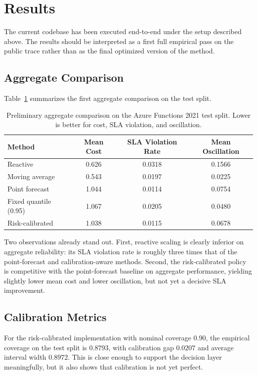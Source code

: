 \documentclass[11pt]{article}
\theoremstyle{plain}
\theoremstyle{definition}
\theoremstyle{remark}
\begin{document}
\section{Results}
The current codebase has been executed end-to-end under the setup described above. The results should be interpreted as a first full empirical pass on the public trace rather than as the final optimized version of the method.

\subsection{Aggregate Comparison}
Table~\ref{tab:aggregate-results} summarizes the first aggregate comparison on the test split.

\begin{table}[h]
\centering
\caption{Preliminary aggregate comparison on the Azure Functions 2021 test split. Lower is better for cost, SLA violation, and oscillation.}
\label{tab:aggregate-results}
\begin{tabular}{lccc}
\toprule
Method & Mean Cost & SLA Violation Rate & Mean Oscillation \\
\midrule
Reactive & 0.626 & 0.0318 & 0.1566 \\
Moving average & 0.543 & 0.0197 & 0.0225 \\
Point forecast & 1.044 & 0.0114 & 0.0754 \\
Fixed quantile (0.95) & 1.067 & 0.0205 & 0.0480 \\
Risk-calibrated & 1.038 & 0.0115 & 0.0678 \\
\bottomrule
\end{tabular}
\end{table}

Two observations already stand out. First, reactive scaling is clearly inferior on aggregate reliability: its SLA violation rate is roughly three times that of the point-forecast and calibration-aware methods. Second, the risk-calibrated policy is competitive with the point-forecast baseline on aggregate performance, yielding slightly lower mean cost and lower oscillation, but not yet a decisive SLA improvement.

\subsection{Calibration Metrics}
For the risk-calibrated implementation with nominal coverage $0.90$, the empirical coverage on the test split is $0.8793$, with calibration gap $0.0207$ and average interval width $0.8972$. This is close enough to support the decision layer meaningfully, but it also shows that calibration is not yet perfect.
\end{document}
